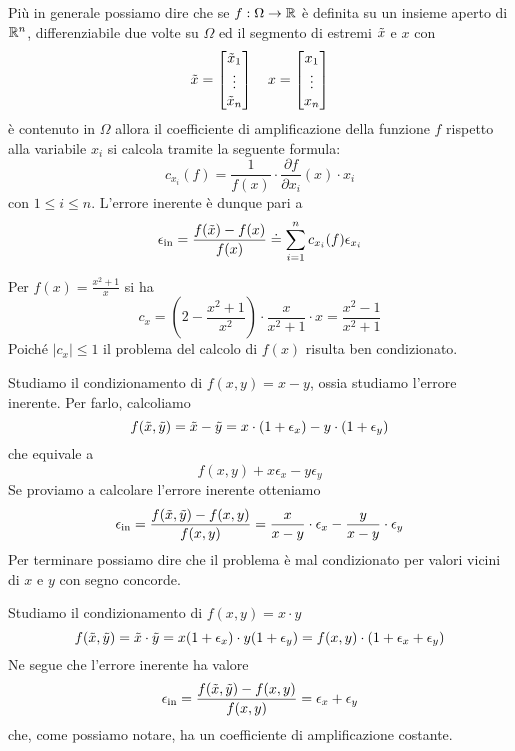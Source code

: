 Più in generale possiamo dire che se $f : \Omega \to \mathbb{R}$ è definita su un insieme aperto di $\mathbb{R}^n$, differenziabile
due volte su $\Omega$ ed il segmento di estremi $\tilde{x}$ e $x$ con
\[
	\tilde{x} = \begin{bmatrix}
		\tilde{x}_1 \\ \vdots \\ \tilde{x}_n
	\end{bmatrix} \quad
	x = \begin{bmatrix}
		x_1 \\ \vdots \\ x_n
	\end{bmatrix}
\]
è contenuto in $\Omega$ allora il coefficiente di amplificazione della funzione $f$ rispetto alla variabile
$x_i$ si calcola tramite la seguente formula:
\[ c_{x_i} (f) = \frac{1}{f(x)} \cdot \frac{\partial f}{\partial x_i} (x) \cdot x_i \]
con $1 \leq i \leq n$. L'errore inerente è dunque pari a
\[ \epsilon_\text{in} = \frac{f(\tilde{x}) - f(x)}{f(x)} \doteq \sum_{i=1}^n c_{x_i} (f) \epsilon_{x_i} \]

\begin{example}
	Per $f(x) = \frac{x^2 + 1}{x}$ si ha
	\[
		c_x = \left( 2 - \frac{x^2 + 1}{x^2} \right) \cdot \frac{x}{x^2 + 1} \cdot x =
		\frac{x^2 - 1}{x^2 + 1}
	\]
	Poiché $|c_x| \leq 1$ il problema del calcolo di $f(x)$ risulta ben condizionato.
\end{example}

\begin{example}
	Studiamo il condizionamento di $f(x, y) = x - y$, ossia studiamo l'errore inerente. Per farlo, calcoliamo
	\[ f(\tilde{x}, \tilde{y}) = \tilde{x} - \tilde{y} = x \cdot (1 + \epsilon_x) - y \cdot (1 + \epsilon_y) \]
	che equivale a
	\[ f(x, y) + x \epsilon_x - y \epsilon_y \]
	Se proviamo a calcolare l'errore inerente otteniamo
	\[
		\epsilon_\text{in} = \frac{f(\tilde{x}, \tilde{y}) - f(x, y)}{f(x, y)} =
		\frac{x}{x - y} \cdot \epsilon_x - \frac{y}{x - y} \cdot \epsilon_y
	\]
	Per terminare possiamo dire che il problema è mal condizionato per valori vicini di $x$ e $y$ con segno
	concorde.
\end{example}

\begin{example}
	Studiamo il condizionamento di $f(x, y) = x\cdot y$
	\[
		f(\tilde{x}, \tilde{y}) = \tilde{x} \cdot \tilde{y} = x (1 + \epsilon_x) \cdot y (1 + \epsilon_y) =
		f(x, y) \cdot (1 + \epsilon_x + \epsilon_y)
	\]
	Ne segue che l'errore inerente ha valore
	\[ \epsilon_\text{in} = \frac{f(\tilde{x}, \tilde{y}) - f(x, y)}{f(x, y)} = \epsilon_x + \epsilon_y \]
	che, come possiamo notare, ha un coefficiente di amplificazione costante.
\end{example}


